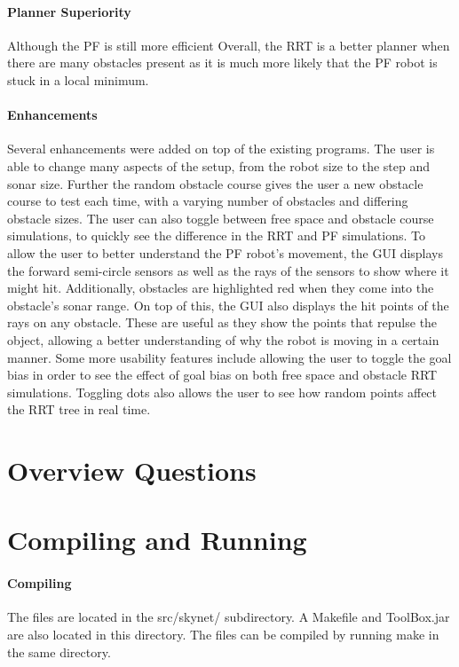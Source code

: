 \documentclass[12pt]{article}
\begin{document}
\paragraph*{Planner Superiority}
Although the PF is still more efficient
Overall, the RRT is a better planner when there are many obstacles present as it is much more likely that the PF robot is stuck in a local minimum. 
\paragraph*{Enhancements}
Several enhancements were added on top of the existing programs. The user is able to change many aspects of the setup, from the robot size to the step and sonar size. Further the random obstacle course gives the user a new obstacle course to test each time, with a varying number of obstacles and differing obstacle sizes. The user can also toggle between free space and obstacle course simulations, to quickly see the difference in the RRT and PF simulations.
To allow the user to better understand the PF robot's movement, the GUI displays the forward semi-circle sensors as well as the rays of the sensors to show where it might hit. Additionally, obstacles are highlighted red when they come into the obstacle's sonar range. On top of this, the GUI also displays the hit points of the rays on any obstacle. These are useful as they show the points that repulse the object, allowing a better understanding of why the robot is moving in a certain manner.
Some more usability features include allowing the user to toggle the goal bias in order to see the effect of goal bias on both free space and obstacle RRT simulations. Toggling dots also allows the user to see how random points affect the RRT tree in real time.

\section{Overview Questions}

\section{Compiling and Running}
\paragraph*{Compiling}
The files are located in the src/skynet/ subdirectory. A Makefile and ToolBox.jar are also located in this directory. The files can be compiled by running make in the same directory. 
\end{document}
